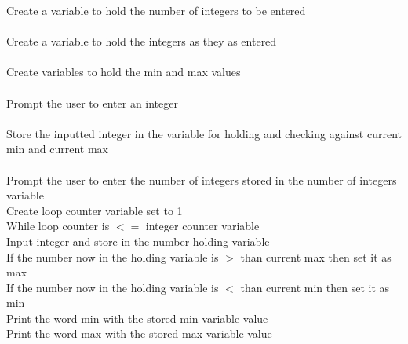 \documentclass{article}
\begin{document}
Create a variable to hold the number of integers to be entered\\ \\
Create a variable to hold the integers as they as entered\\ \\
Create variables to hold the min and max values\\ \\
Prompt the user to enter an integer\\ \\
Store the inputted integer in the variable for holding and checking against current min and current max\\ \\
Prompt the user to enter the number of integers stored in the number of integers variable\\ 

\quad Create loop counter variable set to 1\\

\quad While loop counter is $ <= $ integer counter variable\\

\qquad Input integer and store in the number holding variable\\

\qquad If the number now in the holding variable is $ > $ than current max then set it as max\\

\qquad If the number now in the holding variable is $ < $ than current min then set it as min\\ 

Print the word min with the stored min variable value\\ 

Print the word max with the stored max variable value\\ 


	
\end{document}
